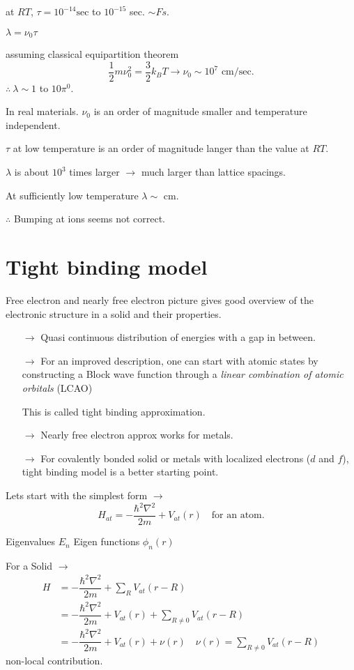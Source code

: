at $RT$, $\tau=10^{-14}\text{sec}$ to $10^{-15}$ sec. $\sim Fs$.

$\lambda=\nu_{0}\tau$

assuming classical equipartition theorem
$$
\frac{1}{2}m\nu^{2}_{0}=\dfrac{3}{2}k_{B}T\to \nu_{0}\sim 10^{7}\text{ cm/sec.}
$$
$\therefore \ \lambda \sim 1$ to $10\pi^{0}$.

In real materials. $\nu_{0}$ is an order of magnitude smaller and temperature independent.

$\tau$ at low temperature is an order of magnitude langer than the value at $RT$.

$\lambda$ is about $10^{3}$ times larger $\to$ much larger than lattice spacings.

At sufficiently low temperature $\lambda\sim\text{ cm}$.

$\therefore$ Bumping at ions seems not correct.

\section*{Tight binding model}

Free electron and nearly free electron picture gives good overview of the electronic structure in a solid and their properties.
\begin{itemize}
\item[$\to$] Quasi continuous distribution of energies with a gap in between.

\item[$\to$] For an improved description, one can start with atomic states by constructing a Block wave function through a {\em linear combination of atomic orbitals} (LCAO) 

This is called tight binding approximation.

\item[$\to$] Nearly free electron approx works for metals.

\item[$\to$] For covalently bonded solid or metals with localized electrons ($d$ and $f$), tight binding model is a better starting point.
\end{itemize} 

Lets start with the simplest form $\to$
$$
H_{at}=-\dfrac{\hbar^{2}\nabla^{2}}{2m}+V_{at}(r)\quad\text{for an atom.}
$$

Eigenvalues $E_{n}$ Eigen functions $\phi_{n}(r)$

For a Solid $\to$
\begin{align*}
H &= -\dfrac{\hbar^{2}\nabla^{2}}{2m}+\sum\limits_{R}V_{at}(r-R)\\[3pt]
  &= -\dfrac{\hbar^{2}\nabla^{2}}{2m}+V_{at}(r)+\sum\limits_{R\neq 0}V_{at}(r-R)\\[3pt]
  &= -\dfrac{\hbar^{2}\nabla^{2}}{2m}+V_{at}(r)+\nu(r)\quad \nu(r)=\sum\limits_{R\neq 0}V_{at}(r-R)
\end{align*}
non-local contribution.

